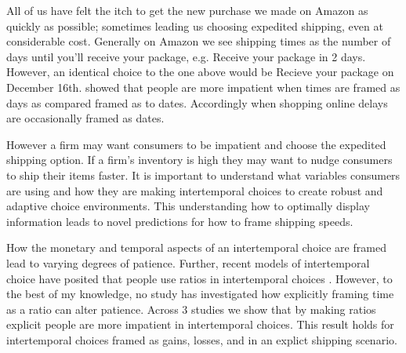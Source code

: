 \documentclass[]{article}
\begin{document}
All of us have felt the itch to get the new purchase we made on Amazon as quickly as possible; sometimes leading us choosing expedited shipping, even at considerable cost. 
Generally on Amazon we see shipping times as the number of days until you'll receive your package, e.g.  Receive your package in 2 days. 
However, an identical choice to the one above would be Recieve your package on December 16th. 
 showed that people are more impatient when times are framed as days as compared framed as to dates. 
Accordingly when shopping online delays are occasionally framed as dates.

However a firm may want consumers to be impatient and choose the expedited shipping option. 
If a firm's inventory is high they may want to nudge consumers to ship their items faster. 
It is important to understand what variables consumers are using and how they are making intertemporal choices to create robust and adaptive choice environments. 
This understanding how to optimally display information leads to novel predictions for how to frame shipping speeds. 

How the monetary and temporal aspects of an intertemporal choice are framed lead to varying degrees of patience.
Further, recent models of intertemporal choice have posited that people use ratios in intertemporal choices \cite{Read2013, MarzilliEricson2015}. 
However, to the best of my knowledge, no study has investigated how explicitly framing time as a ratio can alter patience.
Across 3 studies we show that by making ratios explicit people are more impatient in intertemporal choices. 
This result holds for intertemporal choices framed as gains, losses, and in an explict shipping scenario. 



%
\end{document}
